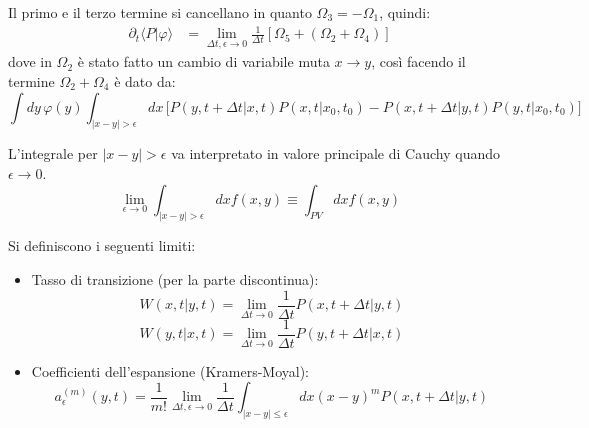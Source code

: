 Il primo e il terzo termine si cancellano in quanto $\Omega_3 = -\Omega_1$, quindi:
\begin{equation}
\begin{aligned}
\partial_t \langle P|\varphi \rangle &=  \lim_{\Delta t, \epsilon \rightarrow 0} \frac{1}{\Delta t} \left[ \Omega_5 + (\Omega_2 +\Omega_4  ) \right]
\end{aligned}
\end{equation}
dove in $\Omega_2$ è stato fatto un cambio di variabile muta $x \to y$, così facendo il termine $\Omega_2 + \Omega_4$ è dato da:
\begin{equation*}
\int dy \, \varphi(y) \int_{|x-y| > \epsilon} dx \, \Biggl[ P(y, t+\Delta t | x, t) P(x, t | x_0, t_0)- P(x, t+\Delta t | y, t) P(y, t | x_0, t_0) \Biggr]
\end{equation*}

\begin{tcolorbox}[
    colback=colorD!5,      
    colframe=colorD,       
    title={Attenzione},
    fonttitle=\bfseries\sffamily,
    arc=3mm,               
    boxrule=1.2pt,         
    halign title=flush left
]
L'integrale per $|x-y|>\epsilon$ va interpretato in valore principale di Cauchy quando $\epsilon \to 0$.
\begin{equation}
\lim_{\epsilon \to 0 } \int_{|x-y|>\epsilon} dx f(x, y) \equiv \int_{PV} dx f(x,y)
\end{equation}
\end{tcolorbox}

Si definiscono i seguenti limiti:
\begin{itemize}
    \item Tasso di transizione (per la parte discontinua):
    \begin{equation}
    W(x,t|y,t) = \lim_{\Delta t \to 0} \frac{1}{\Delta t} P(x, t+\Delta t | y, t)
    \end{equation}
    \begin{equation}
    W(y,t|x,t) = \lim_{\Delta t \to 0} \frac{1}{\Delta t} P(y, t+\Delta t | x, t)
    \end{equation}
    \item Coefficienti dell'espansione (Kramers-Moyal):
    \begin{equation}
    a^{(m)}_{\epsilon}(y,t) = \frac{1}{m!} \lim_{\Delta t, \epsilon \to 0} \frac{1}{\Delta t} \int_{|x-y|\le \epsilon} dx (x-y)^m P(x, t+\Delta t | y, t)
    \end{equation}
\end{itemize}

